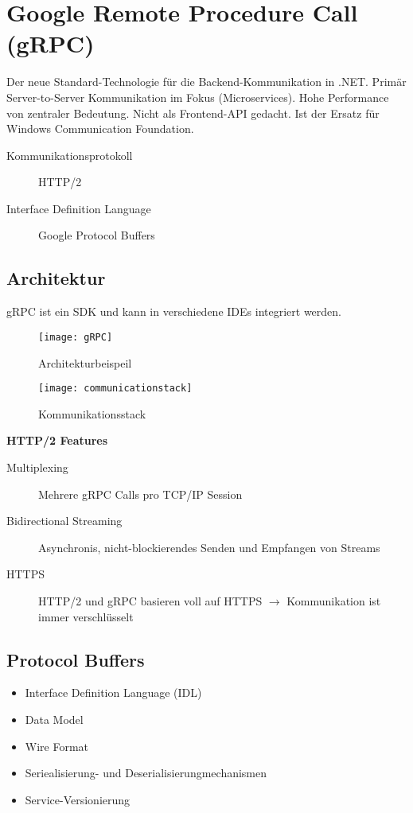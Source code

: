 \section{Google Remote Procedure Call (gRPC)}
Der neue Standard-Technologie für die Backend-Kommunikation in .NET. Primär Server-to-Server Kommunikation im Fokus (Microservices). Hohe Performance von zentraler Bedeutung. Nicht als Frontend-API gedacht. Ist der Ersatz für Windows Communication Foundation.

\begin{description}
  \item[Kommunikationsprotokoll] HTTP/2
  \item[Interface Definition Language] Google Protocol Buffers
\end{description}

\subsection{Architektur}
gRPC ist ein SDK und kann in verschiedene IDEs integriert werden. 

\begin{figure}[h!]
	\centering
	\texttt{[image: gRPC]}
 	\caption{Architekturbeispeil}
\end{figure}

\begin{figure}[h!]
  	\centering
  	\texttt{[image: communicationstack]}
  \caption{Kommunikationsstack}
\end{figure}

\textbf{HTTP/2 Features}
\begin{description}
  \item[Multiplexing] Mehrere gRPC Calls pro TCP/IP Session
  \item[Bidirectional Streaming] Asynchronis, nicht-blockierendes Senden und Empfangen von Streams
  \item[HTTPS] HTTP/2 und gRPC basieren voll auf HTTPS $\rightarrow$ Kommunikation ist immer verschlüsselt
\end{description}

\subsection{Protocol Buffers}
\begin{itemize}
  \itemsep -0.5em 
  \item Interface Definition Language (IDL)
  \item Data Model
  \item Wire Format
  \item Seriealisierung- und Deserialisierungmechanismen
  \item Service-Versionierung
\end{itemize}

